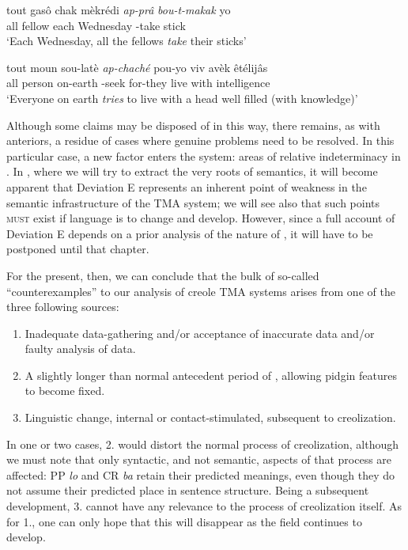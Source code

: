 \ea\label{ex:2:123}
 \gll tout gasô chak mèkrédi \emph{ap-prâ} \emph{bou-t-makak} yo\\
all fellow each Wednesday \ASP-take stick {\PL}\\
\glt `Each Wednesday, all the fellows \textit{take} their sticks'
\z

\ea\label{ex:2:124}
\gll tout moun sou-latè \emph{ap-chaché} pou-yo viv avèk êtélijâs\\
all person on-earth \ASP-seek for-they live with intelligence\\
\glt `Everyone on earth \textit{tries} to live with a head well filled (with knowledge)'
\z

Although some claims may be disposed of in this way, there remains, as with anteriors, a residue of cases where genuine problems need to be resolved. In this particular case, a new factor enters the system: areas of relative indeterminacy in . In , where we will try to extract the very roots of semantics, it will become apparent that Deviation E represents an inherent point of weakness in the semantic infrastructure of the TMA system; we will see also that such points \textsc{must} exist if language is to change and develop. However, since a full account of Deviation E depends on a prior analysis of the nature of , it will have to be postponed until that chapter.

For the present, then, we can conclude that the bulk of so-called ``counterexamples'' to our analysis of creole TMA systems arises from one of the three following sources:

\begin{enumerate}
\item Inadequate data-gathering and/or acceptance of inaccurate data and/or faulty analysis of data.
\item A slightly longer than normal antecedent period of , allowing pidgin features to become fixed.
\item Linguistic change, internal or contact-stimulated, subsequent to creolization.
\end{enumerate}
In one or two cases, 2. would distort the normal process of creolization, although we must note that only syntactic, and not semantic, aspects of that process are affected: PP \textit{lo} and CR \textit{ba} retain their predicted meanings, even though they do not assume their predicted place in sentence structure. Being a subsequent development, 3. cannot have any relevance to the process of creolization itself. As for 1., one can only hope that this will disappear as the field continues to develop.\\\\

